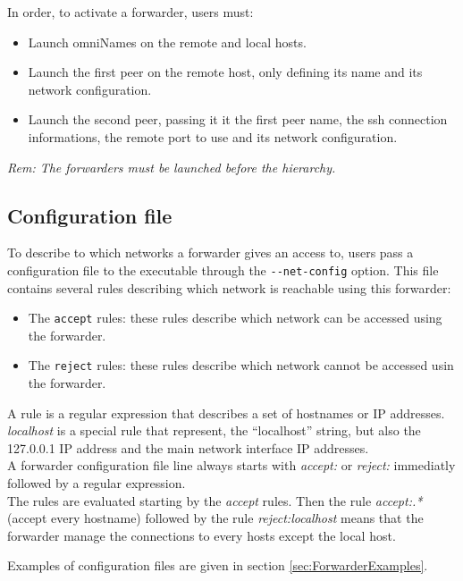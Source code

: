 \noindent In order, to activate a \diet forwarder, users must:
\begin{itemize}
\item Launch omniNames on the remote and local hosts.
\item Launch the first peer on the remote host, only defining its name
  and its network configuration.
\item Launch the second peer, passing it it the first peer name, the
  ssh connection informations, the remote port to use and its network
  configuration.
\end{itemize}

\noindent\textit{Rem: The forwarders must be launched before the \diet
  hierarchy.}
\subsection{Configuration file}
To describe to which networks a forwarder gives an access to, users pass a
configuration file to the executable through the \verb#--net-config#
option. This file contains several rules describing which network is
reachable using this forwarder:
\begin{itemize}
\item The \verb#accept# rules: these rules describe which network can
  be accessed using the forwarder.
\item The \verb#reject# rules: these rules describe which network
  cannot be accessed usin the forwarder.\\
\end{itemize}

A rule is a regular expression that describes a set of hostnames or IP
addresses. \textit{localhost} is a special rule that represent, the
``localhost'' string, but also the 127.0.0.1 IP address and the main
network interface IP addresses.\\

A \diet forwarder configuration file line always starts with
\textit{accept:} or \textit{reject:} immediatly followed by a regular
expression.\\

The rules are evaluated starting by the \textit{accept} rules. Then
the rule \textit{accept:.*} (accept every hostname) followed by the
rule \textit{reject:localhost} means that the forwarder manage the
connections to every hosts except the local host.

Examples of configuration files are given in section
\ref{sec:ForwarderExamples}.


